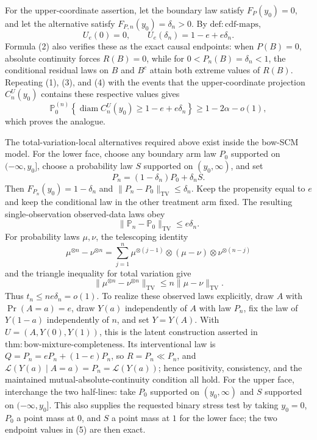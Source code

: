 For the upper-coordinate assertion, let the boundary law satisfy \(F_P(y_0)=0\), and let the alternative satisfy \(F_{P,n}(y_0)=\delta_n>0\).  By \(\mathrm{def:cdf\text{-}maps}\),
\[
 U_e(0)=0,
 \qquad
 U_e(\delta_n)=1-e+e\delta_n.
\]
Formula (2) also verifies these as the exact causal endpoints: when \(P(B)=0\), absolute continuity forces \(R(B)=0\), while for \(0<P_n(B)=\delta_n<1\), the conditional residual laws on \(B\) and \(B^c\) attain both extreme values of \(R(B)\).  Repeating (1), (3), and (4) with the events that the upper-coordinate projection \(C_n^U(y_0)\) contains these respective values gives
\[
 \mathbb P_0^{(n)}\left\{\operatorname{diam}C_n^U(y_0)\geq1-e+e\delta_n\right\}
 \geq1-2\alpha-o(1),
\]
which proves the analogue.

The total-variation-local alternatives required above exist inside the bow-SCM model.  For the lower face, choose any boundary arm law \(P_0\) supported on \(({-}\infty,y_0]\), choose a probability law \(S\) supported on \((y_0,\infty)\), and set
\[
 P_n=(1-\delta_n)P_0+\delta_n S.
\]
Then \(F_{P_n}(y_0)=1-\delta_n\) and \(\|P_n-P_0\|_{\mathrm{TV}}\leq\delta_n\).  Keep the propensity equal to \(e\) and keep the conditional law in the other treatment arm fixed.  The resulting single-observation observed-data laws obey
\[
 \|\mathbb P_n-\mathbb P_0\|_{\mathrm{TV}}\leq e\delta_n.
\]
For probability laws \(\mu,\nu\), the telescoping identity
\[
 \mu^{\otimes n}-\nu^{\otimes n}
 =\sum_{j=1}^n
 \mu^{\otimes(j-1)}\otimes(\mu-\nu)\otimes\nu^{\otimes(n-j)}
\]
and the triangle inequality for total variation give
\[
 \|\mu^{\otimes n}-\nu^{\otimes n}\|_{\mathrm{TV}}
 \leq n\|\mu-\nu\|_{\mathrm{TV}}.
\]
Thus \(t_n\leq ne\delta_n=o(1)\).  To realize these observed laws explicitly, draw \(A\) with \(\Pr(A=a)=e\), draw \(Y(a)\) independently of \(A\) with law \(P_n\), fix the law of \(Y(1-a)\) independently of \(n\), and set \(Y=Y(A)\).  With \(U=(A,Y(0),Y(1))\), this is the latent construction asserted in \(\mathrm{thm:bow\text{-}mixture\text{-}completeness}\).  Its interventional law is \(Q=P_n=eP_n+(1-e)P_n\), so \(R=P_n\ll P_n\), and \(\mathcal L(Y(a)\mid A=a)=P_n=\mathcal L(Y(a))\); hence positivity, consistency, and the maintained mutual-absolute-continuity condition all hold.  For the upper face, interchange the two half-lines: take \(P_0\) supported on \((y_0,\infty)\) and \(S\) supported on \(({-}\infty,y_0]\).  This also supplies the requested binary stress test by taking \(y_0=0\), \(P_0\) a point mass at \(0\), and \(S\) a point mass at \(1\) for the lower face; the two endpoint values in (5) are then exact.

